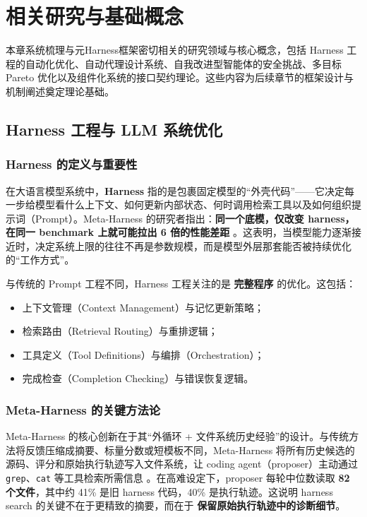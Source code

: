 \chapter{相关研究与基础概念}

本章系统梳理与元Harness框架密切相关的研究领域与核心概念，包括 Harness 工程的自动化优化、自动代理设计系统、自我改进型智能体的安全挑战、多目标 Pareto 优化以及组件化系统的接口契约理论。这些内容为后续章节的框架设计与机制阐述奠定理论基础。

\section{Harness 工程与 LLM 系统优化}

\subsection{Harness 的定义与重要性}

在大语言模型系统中，\textbf{Harness} 指的是包裹固定模型的“外壳代码”——它决定每一步给模型看什么上下文、如何更新内部状态、何时调用检索工具以及如何组织提示词（Prompt）。Meta-Harness 的研究者指出：\textbf{同一个底模，仅改变 harness，在同一 benchmark 上就可能拉出 6 倍的性能差距} \cite{lee2026metaharness}。这表明，当模型能力逐渐接近时，决定系统上限的往往不再是参数规模，而是模型外层那套能否被持续优化的“工作方式”。

与传统的 Prompt 工程不同，Harness 工程关注的是 \textbf{完整程序} 的优化。这包括：
\begin{itemize}
    \item 上下文管理（Context Management）与记忆更新策略；
    \item 检索路由（Retrieval Routing）与重排逻辑；
    \item 工具定义（Tool Definitions）与编排（Orchestration）；
    \item 完成检查（Completion Checking）与错误恢复逻辑。
\end{itemize}

\subsection{Meta-Harness 的关键方法论}

Meta-Harness 的核心创新在于其“外循环 + 文件系统历史经验”的设计。与传统方法将反馈压缩成摘要、标量分数或短模板不同，Meta-Harness 将所有历史候选的源码、评分和原始执行轨迹写入文件系统，让 coding agent（proposer）主动通过 \texttt{grep}、\texttt{cat} 等工具检索所需信息 \cite{lee2026metaharness}。在高难设定下，proposer 每轮中位数读取 \textbf{82 个文件}，其中约 41\% 是旧 harness 代码，40\% 是执行轨迹。这说明 harness search 的关键不在于更精致的摘要，而在于 \textbf{保留原始执行轨迹中的诊断细节}。

